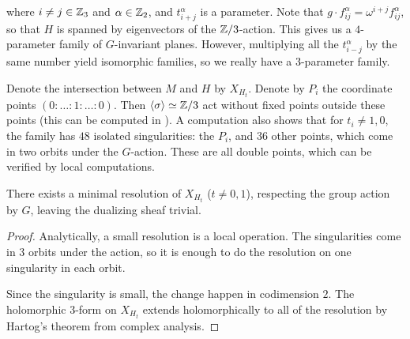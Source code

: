 where $i \neq j \in \mathbb{Z}_3$ and $\alpha \in \mathbb{Z}_2$, and $t_{i+j}^\alpha$ is a parameter. Note that $g \cdot f_{ij}^\alpha = \omega^{i+j} f_{ij}^\alpha$, so that $H$ is spanned by eigenvectors of the $\mathbb{Z}/3$-action. This gives us a $4$-parameter family of $G$-invariant planes. However, multiplying all the $t_{i-j}^\alpha$ by the same number yield isomorphic families, so we really have a $3$-parameter family.

Denote the intersection between $M$ and $H$ by $X_{H_t}$. Denote by $P_i$ the coordinate points $(0:\ldots:1:\ldots:0)$. Then $\langle \sigma \rangle \simeq \mathbb{Z}/3$ act without fixed points outside these points (this can be computed in \MM). A \MM computation also shows that for $t_i \neq 1,0$, the family has $48$ isolated singularities: the $P_i$, and $36$ other points, which come in two orbits under the $G$-action. These are all double points, which can be verified by local computations.

\begin{lemma}
There exists a minimal resolution of $X_{H_t}$ ($t \neq 0,1$), respecting the group action by $G$, leaving the dualizing sheaf trivial.
\end{lemma}
\begin{proof}
Analytically, a small resolution is a local operation. The singularities come in $3$ orbits under the action, so it is enough to do the resolution on one singularity in each orbit.

Since the singularity is small, the change happen in codimension $2$. The holomorphic $3$-form on $X_{H_t}$ extends holomorphically to all of the resolution by Hartog's theorem from complex analysis.
\end{proof}

